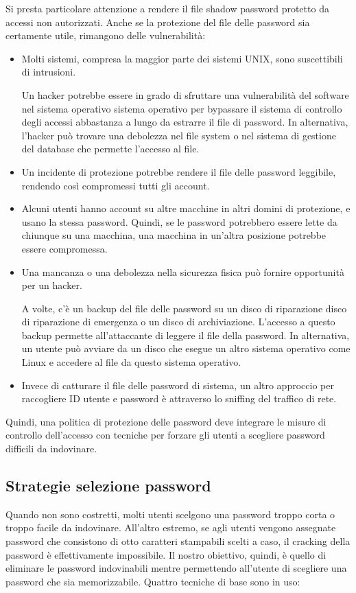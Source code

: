 Si presta particolare attenzione a rendere il file shadow password protetto da accessi non autorizzati. Anche se la protezione del file delle password sia certamente utile, rimangono delle vulnerabilità:

\begin{itemize}
    \item Molti sistemi, compresa la maggior parte dei sistemi UNIX, sono suscettibili di intrusioni.

Un hacker potrebbe essere in grado di sfruttare una vulnerabilità del software nel sistema operativo sistema operativo per bypassare il sistema di controllo degli accessi abbastanza a lungo da estrarre il file di password. In alternativa, l'hacker può trovare una debolezza nel file system o nel sistema di gestione del database che permette l'accesso al file.

    \item Un incidente di protezione potrebbe rendere il file delle password leggibile, rendendo così compromessi tutti gli account.

    \item Alcuni utenti hanno account su altre macchine in altri domini di protezione, e usano la stessa password. Quindi, se le password potrebbero essere lette da chiunque su una macchina, una macchina in un'altra posizione potrebbe essere compromessa.

    \item Una mancanza o una debolezza nella sicurezza fisica può fornire opportunità per un hacker.

A volte, c'è un backup del file delle password su un disco di riparazione disco di riparazione di emergenza o un disco di archiviazione. L'accesso a questo backup permette all'attaccante di leggere il file della password. In alternativa, un utente può avviare da un disco che esegue un altro sistema operativo come Linux e accedere al file da questo sistema operativo.


    \item Invece di catturare il file delle password di sistema, un altro approccio per raccogliere ID utente e password è attraverso lo sniffing del traffico di rete.
\end{itemize}
\singlespacing
Quindi, una politica di protezione delle password deve integrare le misure di controllo dell'accesso con tecniche per forzare gli utenti a scegliere password difficili da indovinare.

\newpage
\subsection{Strategie selezione password}
Quando non sono costretti, molti utenti scelgono una password troppo corta o troppo facile da indovinare. All'altro estremo, se agli utenti vengono assegnate password che consistono di otto caratteri stampabili scelti a caso, il cracking della password è effettivamente impossibile. Il nostro obiettivo, quindi, è quello di eliminare le password indovinabili mentre permettendo all'utente di scegliere una password che sia memorizzabile. Quattro tecniche di base sono in uso:

